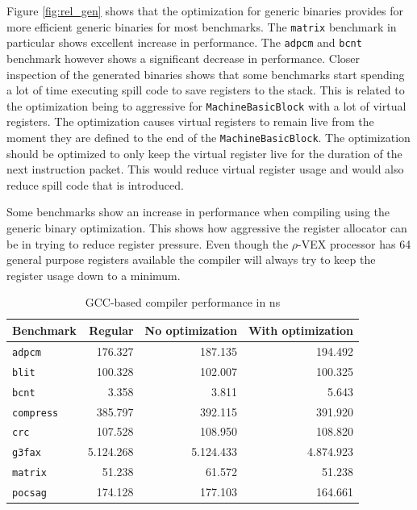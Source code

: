 Figure \ref{fig:rel_gen} shows that the optimization for generic binaries provides for more efficient generic binaries for most benchmarks. The \texttt{matrix} benchmark in particular shows excellent increase in performance. The \texttt{adpcm} and \texttt{bcnt} benchmark however shows a significant decrease in performance. Closer inspection of the generated binaries shows that some benchmarks start spending a lot of time executing spill code to save registers to the stack. This is related to the optimization being to aggressive for \texttt{MachineBasicBlock} with a lot of virtual registers. The optimization causes virtual registers to remain live from the moment they are defined to the end of the \texttt{MachineBasicBlock}. The optimization should be optimized to only keep the virtual register live for the duration of the next instruction packet. This would reduce virtual register usage and would also reduce spill code that is introduced.

Some benchmarks show an increase in performance when compiling using the generic binary optimization. This shows how aggressive the register allocator can be in trying to reduce register pressure. Even though the $\rho$-VEX processor has 64 general purpose registers available the compiler will always try to keep the register usage down to a minimum.  

\begin{table}
  \centering
    \begin{tabular}{|l|r|r|r|}
    \hline
    \textbf{Benchmark} & \multicolumn{1}{|r|}{\textbf{Regular}} & \multicolumn{1}{|r|}{\textbf{No optimization}} & \multicolumn{1}{|r|}{\textbf{With optimization}} \\ \hline
	\texttt{adpcm} 		&  176.327 	&	 187.135 	&	 194.492 	\\ \hline
	\texttt{blit} 		&  100.328 	&	 102.007 	&	 100.325 	\\ \hline
	\texttt{bcnt} 		&  3.358  	&	 3.811 		&	 5.643	 	\\ \hline
	\texttt{compress} 	&  385.797 	&	 392.115 	&	 391.920 	\\ \hline
	\texttt{crc} 		&  107.528 	&	 108.950 	&	 108.820 	\\ \hline
	\texttt{g3fax} 		& 5.124.268	& 	 5.124.433	& 	 4.874.923 	\\ \hline
	\texttt{matrix} 	&  51.238 	&	 61.572 	&	 51.238 	\\ \hline
	\texttt{pocsag} 	& 174.128	& 	177.103		& 	 164.661  	\\ \hline
    \end{tabular}
  \caption{GCC-based compiler performance in ns}
  \label{tbl:GCC_perf}
\end{table}

